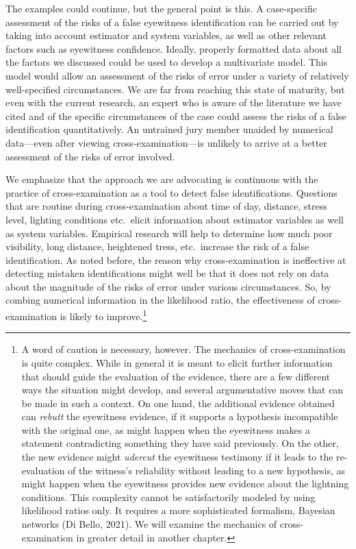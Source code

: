 \documentclass[
  10pt,
  dvipsnames,enabledeprecatedfontcommands]{scrartcl}
\begin{document}
\vspace{1mm}
\footnotesize

\normalsize

The examples could continue, but the general point is this. A
case-specific assessment of the risks of a false eyewitness
identification can be carried out by taking into account estimator and
system variables, as well as other relevant factors such as eyewitness
confidence. Ideally, properly formatted data about all the factors we
discussed could be used to develop a multivariate model. This model
would allow an assessment of the risks of error under a variety of
relatively well-specified circumstances. We are far from reaching this
state of maturity, but even with the current research, an expert who is
aware of the literature we have cited and of the specific circumstances
of the case could assess the risks of a false identification
quantitatively. An untrained jury member unaided by numerical
data---even after viewing cross-examination---is unlikely to arrive at a
better assessment of the risks of error involved.

We emphasize that the approach we are advocating is continuous with the
practice of cross-examination as a tool to detect false identifications.
Questions that are routine during cross-examination about time of day,
distance, stress level, lighting conditions etc.~elicit information
about estimator variables as well as system variables. Empirical
research will help to determine how much poor visibility, long distance,
heightened tress, etc.~increase the risk of a false identification. As
noted before, the reason why cross-examination is ineffective at
detecting mistaken identifications might well be that it does not rely
on data about the magnitude of the risks of error under various
circumstances. So, by combing numerical information in the likelihood
ratio, the effectiveness of cross-examination is likely to
improve.\footnote{A word of caution is necessary, however. The mechanics
  of cross-examination is quite complex. While in general it is meant to
  elicit further information that should guide the evaluation of the
  evidence, there are a few different ways the situation might develop,
  and several argumentative moves that can be made in such a context. On
  one hand, the additional evidence obtained can \textit{rebutt} the
  eyewitness evidence, if it supports a hypothesis incompatible with the
  original one, as might happen when the eyewitness makes a statement
  contradicting something they have said previously. On the other, the
  new evidence might \textit{udercut} the eyewitness testimony if it
  leads to the re-evaluation of the witness's reliability without
  leading to a new hypothesis, as might happen when the eyewitness
  provides new evidence about the lightning conditions. This complexity
  cannot be satisfactorily modeled by using likelihood ratios only. It
  requires a more sophisticated formalism, Bayesian networks (Di Bello,
  2021). We will examine the mechanics of cross-examination in greater
  detail in another chapter.}
\end{document}

